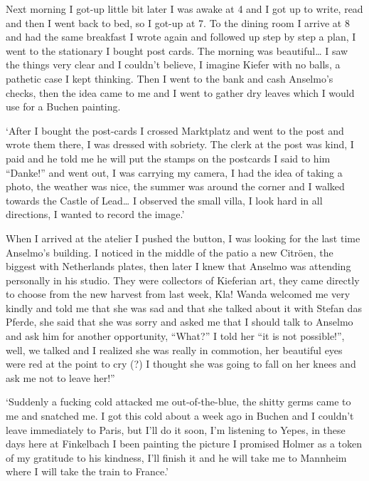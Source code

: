 \documentclass[smalldemyvopaper,11pt,twoside,onecolumn,openright,extrafontsizes]{memoir}
\begin{document}
Next morning I got-up little bit later I was awake at 4 and I got up to write, read and then I went back to bed, so I got-up at 7. To the dining room I arrive at 8 and had the same breakfast I wrote again and followed up step by step a plan, I went to the stationary I bought post cards. The morning was beautiful… I saw the things very clear and I couldn’t believe, I imagine Kiefer with no balls, a pathetic case I kept thinking. Then I went to the bank and cash Anselmo’s checks, then the idea came to me and I went to gather dry leaves which I would use for a Buchen painting. 

\ornamentbreak

‘After I bought the post-cards I crossed Marktplatz and went to the post and wrote them there, I was dressed with sobriety. The clerk at the post was kind, I paid and he told me he will put the stamps on the postcards I said to him “Danke!” and went out, I was carrying my camera, I had the idea of taking a photo, the weather was nice, the summer was around the corner and I walked towards the Castle of Lead… I observed the small villa, I look hard in all directions, I wanted to record the image.’

When I arrived at the atelier I pushed the button, I was looking for the last time Anselmo’s building. I noticed in the middle of the patio a new Citröen, the biggest with Netherlands plates, then later I knew that Anselmo was attending personally in his studio. They were collectors of Kieferian art, they came directly to choose from the new harvest from last week, Kla! Wanda welcomed me very kindly and told me that she was sad and that she talked about it with Stefan das Pferde,  she said that she was sorry and asked me that I should talk to Anselmo and ask him for another opportunity, “What?” I told her “it is not possible!”, well, we talked and I realized she was really in  commotion, her beautiful eyes were red at the point to cry (?) I thought she was going to fall on her knees and ask me not to leave her!”

\ornamentbreak

‘Suddenly a fucking cold attacked me out-of-the-blue, the shitty germs came to me and snatched me. I got this cold about a week ago in Buchen and I couldn’t leave immediately to Paris, but I’ll do it soon, I’m listening to Yepes, in these days here at Finkelbach I been painting the picture I promised Holmer as a token of my gratitude to his kindness, I’ll finish it and he will take me to Mannheim where I will take the train to France.’ 
\end{document}
